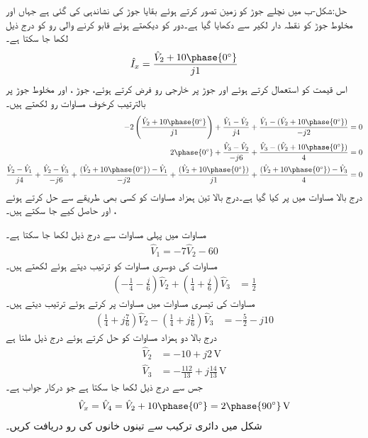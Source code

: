 حل:شکل-ب میں نچلے جوڑ کو زمین تصور کرتے ہوئے بقایا جوڑ کی نشاندہی کی گئی ہے جہاں  اور  مخلوط جوڑ کو نقطہ دار لکیر سے دکھایا گیا ہے۔دور کو دیکھتے ہوئے قابو کرنے والی رو کو درج ذیل لکھا جا سکتا ہے۔
\begin{align*}
\hat{I}_x=\frac{\hat{V}_2+10\phase{0^{\circ}}}{j1}
\end{align*}
اس قیمت کو استعمال کرتے ہوئے اور جوڑ پر خارجی رو فرض کرتے ہوئے، جوڑ ،   اور مخلوط جوڑ پر بالترتیب کرخوف مساوات رو لکھتے ہیں۔
\begin{gather}
\begin{aligned}\label{مساوات_بدلتا_جڑوا_جوڑ_الف}
-2\left(\frac{\hat{V}_2+10\phase{0^{\circ}}}{j1}\right)+\frac{\hat{V}_1-\hat{V}_2}{j4}+\frac{\hat{V}_1-(\hat{V}_2+10\phase{0^{\circ}})}{-j2}&=0\\
2\phase{0^{\circ}}+\frac{\hat{V}_3-\hat{V}_2}{-j6}+\frac{\hat{V}_3-(\hat{V}_2+10\phase{0^{\circ}})}{4}&=0\\
\frac{\hat{V}_2-\hat{V}_1}{j4}+\frac{\hat{V}_2-\hat{V}_3}{-j6}+\frac{(\hat{V}_2+10\phase{0^{\circ}})-\hat{V}_1}{-j2}+\frac{(\hat{V}_2+10\phase{0^{\circ}})}{j1}+\frac{(\hat{V}_2+10\phase{0^{\circ}})-\hat{V}_3}{4}&=0
\end{aligned}
\end{gather}
درج بالا مساوات میں  پر کیا گیا ہے۔درج بالا تین ہمزاد مساوات کو کسی بھی طریقے سے حل کرتے ہوئے ،  اور  حاصل کیے جا سکتے ہیں۔

مساوات  میں پہلی مساوات سے  درج ذیل لکھا جا سکتا ہے۔
\begin{align}\label{مساوات_بدلتا_جڑوا_جوڑ_ب}
\hat{V}_1=-7\hat{V}_2-60
\end{align}
مساوات  کی دوسری مساوات کو ترتیب دیتے ہوئے لکھتے ہیں۔
\begin{align}\label{مساوات_بدلتا_جڑوا_جوڑ_پ}
\left(-\frac{1}{4}-\frac{j}{6}\right)\hat{V}_2+\left(\frac{1}{4}+\frac{j}{6}\right)\hat{V}_3&=\frac{1}{2}
\end{align}
مساوات  کی تیسری مساوات میں مساوات  پر کرتے ہوئے ترتیب دیتے ہیں۔
\begin{align}\label{مساوات_بدلتا_جڑوا_جوڑ_ت}
\left(\frac{1}{4}+j\frac{7}{6}\right)\hat{V}_2-\left(\frac{1}{4}+j\frac{1}{6}\right)\hat{V}_3&=-\frac{5}{2}-j10
\end{align}
درج بالا دو ہمزاد مساوات کو حل کرتے ہوئے درج ذیل ملتا ہے
\begin{align*}
\hat{V}_2&=-10+j2\,\si{\volt}\\
\hat{V}_3&=-\frac{112}{13}+j\frac{14}{13}\,\si{\volt}
\end{align*}
جس سے درج ذیل لکھا جا سکتا ہے جو درکار جواب ہے۔
\begin{align*}
\hat{V}_x=\hat{V}_4=\hat{V}_2+10\phase{0^{\circ}}=2\phase{90^{\circ}} \, \si{\volt}
\end{align*}
شکل  میں دائری ترکیب سے  تینوں خانوں کی رو دریافت کریں۔

